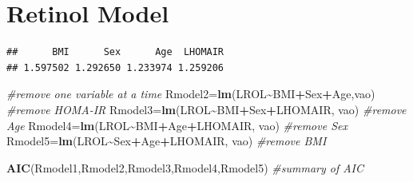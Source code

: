 \documentclass[
]{article}
\newenvironment{Shaded}{\begin{snugshade}}{\end{snugshade}}
\newcommand{\CommentTok}[1]{\textcolor[rgb]{0.56,0.35,0.01}{\textit{#1}}}
\newcommand{\FunctionTok}[1]{\textcolor[rgb]{0.13,0.29,0.53}{\textbf{#1}}}
\newcommand{\NormalTok}[1]{#1}
\newcommand{\OtherTok}[1]{\textcolor[rgb]{0.56,0.35,0.01}{#1}}
\newcommand{\SpecialCharTok}[1]{\textcolor[rgb]{0.81,0.36,0.00}{\textbf{#1}}}
\begin{document}
\newpage

\section{Retinol Model}\label{retinol-model}

\begin{Shaded}
\end{Shaded}

\begin{verbatim}
##      BMI      Sex      Age  LHOMAIR 
## 1.597502 1.292650 1.233974 1.259206
\end{verbatim}

\begin{Shaded}
\begin{Highlighting}[]
\CommentTok{\#remove one variable at a time}
\NormalTok{Rmodel2}\OtherTok{=}\FunctionTok{lm}\NormalTok{(LROL}\SpecialCharTok{\textasciitilde{}}\NormalTok{BMI}\SpecialCharTok{+}\NormalTok{Sex}\SpecialCharTok{+}\NormalTok{Age,vao) }\CommentTok{\#remove HOMA{-}IR}
\NormalTok{Rmodel3}\OtherTok{=}\FunctionTok{lm}\NormalTok{(LROL}\SpecialCharTok{\textasciitilde{}}\NormalTok{BMI}\SpecialCharTok{+}\NormalTok{Sex}\SpecialCharTok{+}\NormalTok{LHOMAIR, vao) }\CommentTok{\#remove Age}
\NormalTok{Rmodel4}\OtherTok{=}\FunctionTok{lm}\NormalTok{(LROL}\SpecialCharTok{\textasciitilde{}}\NormalTok{BMI}\SpecialCharTok{+}\NormalTok{Age}\SpecialCharTok{+}\NormalTok{LHOMAIR, vao) }\CommentTok{\#remove Sex}
\NormalTok{Rmodel5}\OtherTok{=}\FunctionTok{lm}\NormalTok{(LROL}\SpecialCharTok{\textasciitilde{}}\NormalTok{Sex}\SpecialCharTok{+}\NormalTok{Age}\SpecialCharTok{+}\NormalTok{LHOMAIR, vao) }\CommentTok{\#remove BMI}

\FunctionTok{AIC}\NormalTok{(Rmodel1,Rmodel2,Rmodel3,Rmodel4,Rmodel5) }\CommentTok{\#summary of AIC}
\end{Highlighting}
\end{Shaded}
\end{document}

